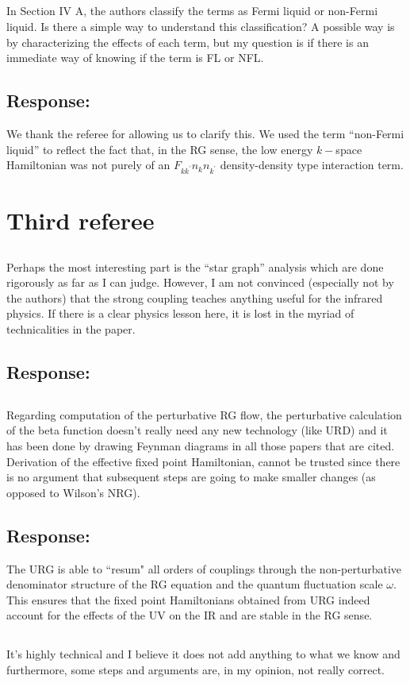 \documentclass[11pt]{article}
\newcommand{\response}[1]{{\color{blue}\subsection*{Response:}{#1}}}
\newcommand{\point}[1]{\subsection{}{#1}}
\begin{document}
\point{
In Section IV A, the authors classify the terms as Fermi liquid or non-Fermi liquid. Is there a simple way to understand this classification? A possible way is by characterizing the effects of each term, but my question is if there is an immediate way of knowing if the term is FL or NFL.}

\response{ We thank the referee for allowing us to clarify this. We used the term “non-Fermi liquid” to reflect the fact that, in the RG sense, the low energy $k−$space Hamiltonian was not purely of an $F_{kk^\prime} n_k n_{k^\prime}$ density-density type interaction term.} 

\section{Third referee}

\point{
Perhaps the most interesting part is the “star graph” analysis which
are done rigorously as far as I can judge. However, I am not convinced
(especially not by the authors) that the strong coupling teaches
anything useful for the infrared physics. If there is a clear physics
lesson here, it is lost in the myriad of technicalities in the paper.
}

\response{
}

\point{
Regarding computation of the perturbative RG flow, the perturbative
calculation of the beta function doesn’t really need any new
technology (like URD) and it has been done by drawing Feynman diagrams
in all those papers that are cited. Derivation of the effective fixed
point Hamiltonian, cannot be trusted since there is no argument that
subsequent steps are going to make smaller changes (as opposed to
Wilson’s NRG).
}

\response{
The URG is able to ``resum" all orders of couplings through the non-perturbative denominator structure of the RG equation and the quantum fluctuation scale \(\omega\). This ensures that the fixed point Hamiltonians obtained from URG indeed account for the effects of the UV on the IR and are stable in the RG sense.
}

\point{
It’s highly
technical and I believe it does not add anything to what we know and
furthermore, some steps and arguments are, in my opinion, not really
correct.
}
\end{document}
